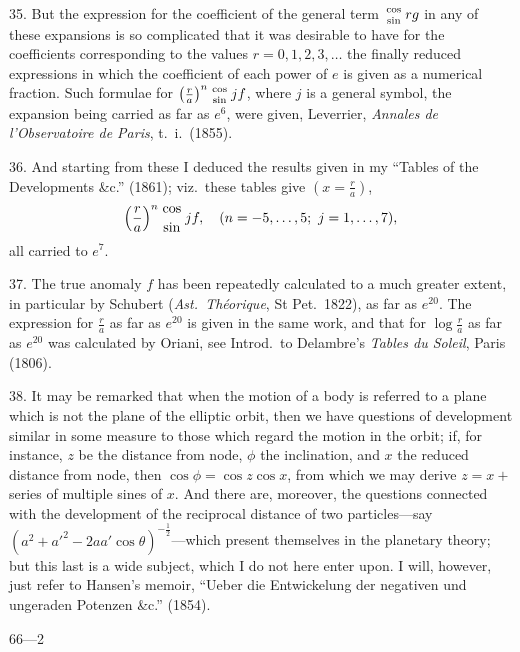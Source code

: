 \documentclass[11pt]{article}
\begin{document}
35. But the expression for the coefficient of the general term $\genfrac{}{}{0pt}{}{\cos}{\sin}\,rg$ in any of these expansions is so complicated that it was desirable to have for the coefficients corresponding to the values $r=0,1,2,3,\ldots$ the finally reduced expressions in which the coefficient of each power of $e$ is given as a numerical fraction. Such formulae for $\left(\frac{r}{a}\right)^{n}\genfrac{}{}{0pt}{}{\cos}{\sin}\,jf$, where $j$ is a general symbol, the expansion being carried as far as $e^{6}$, were given, Leverrier, \emph{Annales de l'Observatoire de Paris}, t.\ i.\ (1855).

36. And starting from these I deduced the results given in my ``Tables of the Developments \&c.'' (1861); viz.\ these tables give $\left(x=\frac{r}{a}\right)$,
\[ \left(\frac{r}{a}\right)^{n}\genfrac{}{}{0pt}{}{\cos}{\sin}\,jf,\quad (n=-5,\ldots,5;\ j=1,\ldots,7), \]
all carried to $e^{7}$.

37. The true anomaly $f$ has been repeatedly calculated to a much greater extent, in particular by Schubert (\emph{Ast.\ Th\'eorique}, St Pet.\ 1822), as far as $e^{20}$. The expression for $\frac{r}{a}$ as far as $e^{20}$ is given in the same work, and that for $\log\frac{r}{a}$ as far as $e^{20}$ was calculated by Oriani, see Introd.\ to Delambre's \emph{Tables du Soleil}, Paris (1806).

38. It may be remarked that when the motion of a body is referred to a plane which is not the plane of the elliptic orbit, then we have questions of development similar in some measure to those which regard the motion in the orbit; if, for instance, $z$ be the distance from node, $\phi$ the inclination, and $x$ the reduced distance from node, then $\cos\phi = \cos z\cos x$, from which we may derive $z=x+$ series of multiple sines of $x$. And there are, moreover, the questions connected with the development of the reciprocal distance of two particles---say $(a^{2}+a'^{2}-2aa'\cos\theta)^{-\frac{1}{2}}$---which present themselves in the planetary theory; but this last is a wide subject, which I do not here enter upon. I will, however, just refer to Hansen's memoir, ``Ueber die Entwickelung der negativen und ungeraden Potenzen \&c.'' (1854).

\begin{flushright}\small 66---2\end{flushright}
\end{document}
